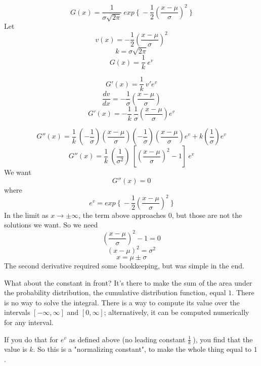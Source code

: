 \documentclass[11pt, oneside]{article}
\begin{document}
\[ G(x) = \frac{1}{\sigma \sqrt{2 \pi}} \ exp \ \{ \ -\frac{1}{2} (\frac{x - \mu}{\sigma} )^2\ \} \]
Let
\[ v(x) = -\frac{1}{2} (\frac{x - \mu}{\sigma} )^2 \]
\[ k = \sigma \sqrt{2 \pi} \]
\[ G(x) = \frac{1}{k} \ e^v \]

\[ G'(x) = \frac{1}{k} \  v' e^v\]
\[ \frac{dv}{dx} = -\frac{1}{\sigma} (\frac{x - \mu}{\sigma}) \]
\[ G'(x) = - \frac{1}{k} \  \frac{1}{\sigma} (\frac{x - \mu}{\sigma}) e^v\]

\[ G''(x) = \frac{1}{k} \ (-\frac{1}{\sigma}) (\frac{x - \mu}{\sigma}) (-\frac{1}{\sigma}) (\frac{x - \mu}{\sigma}) e^v + k (\frac{1}{\sigma}) e^v \]
\[ G''(x) = \frac{1}{k} \ (\frac{1}{\sigma^2}) \ [(\frac{x - \mu}{\sigma})^2 - 1] \ e^v \]
We want
\[ G''(x) = 0 \]
where
\[ e^v = exp \ \{ \ -\frac{1}{2} (\frac{x - \mu}{\sigma} )^2\ \} \]
In the limit as $x \to \pm \infty$, the term above approaches $0$, but those are not the solutions we want.  So we need
\[ (\frac{x - \mu}{\sigma})^2 - 1 = 0 \]
\[ (x-\mu)^2 = \sigma^2 \]
\[ x = \mu \pm \sigma \]
The second derivative required some bookkeeping, but was simple in the end.

What about the constant in front?  It's there to make the sum of the area under the probability distribution, the cumulative distribution function, equal $1$.  There is no way to solve the integral.  There is a way to compute its value over the intervals $[-\infty, \infty]$ and $[0,\infty]$;  alternatively, it can be computed numerically for any interval.

If you do that for $e^v$ as defined above (no leading constant $\frac{1}{k} \ $), you find that the value is $k$.  So this is a "normalizing constant", to make the whole thing equal to $1$.
\end{document}
